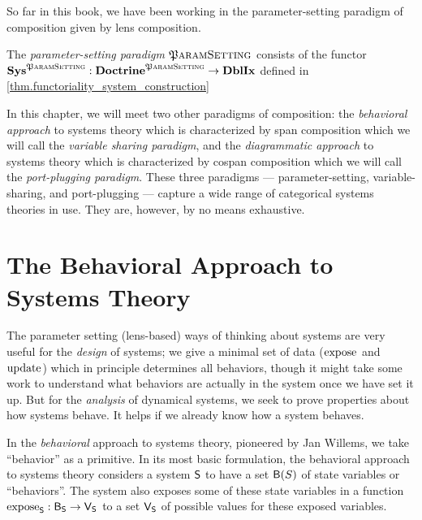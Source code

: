 \documentclass[DynamicalBook]{subfiles}
\begin{document}
So far in this book, we have been working in the parameter-setting paradigm of composition given by lens composition.
\begin{definition}
The \emph{parameter-setting paradigm} $\mathfrak{P}\textsc{aramSetting}$ consists of the functor $\textbf{Sys}^{{\mathfrak{P}\textsc{aramSetting}}} : \textbf{Doctrine}^{\mathfrak{P}\textsc{aramSetting}} \to \textbf{DblIx}$ defined in \cref{thm.functoriality_system_construction}
  \end{definition}

  In this chapter, we will meet two other paradigms of composition: the \emph{behavioral approach} to systems theory which is characterized by span composition which we will call the \emph{variable sharing paradigm}, and the \emph{diagrammatic approach} to systems theory which is characterized by cospan composition which we will call the \emph{port-plugging paradigm}. These three paradigms --- parameter-setting, variable-sharing, and port-plugging --- capture a wide range of categorical systems theories in use. They are, however, by no means exhaustive.





\section{The Behavioral Approach to Systems Theory}\label{sec:behavioral.approach}

The parameter setting (lens-based) ways of thinking about systems are very useful for the \emph{design} of systems; we give
a minimal set of data ($\mathrm{expose}_{\mathsf{}}$ and $\mathrm{update}_{\mathsf{}}$) which in principle determines all behaviors, though it
might take some work to understand what behaviors are actually in the system
once we have set it up. But for the \emph{analysis} of dynamical systems, we
seek to prove properties about how systems behave. It helps if we
already know how a system behaves.

In the \emph{behavioral} approach to systems theory, pioneered by Jan Willems,
we take ``behavior'' as a primitive. In its most basic formulation, the behavioral
approach to systems theory considers a system $\mathsf{S}$ to have a set
$\mathsf{B}(S)$ of state variables or ``behaviors''. The system also exposes some of these
state variables in a function $\mathrm{expose}_{\mathsf{S}} : \mathsf{B}_{\mathsf{S}} \to \mathsf{V}_{\mathsf{S}}$
to a set
$\mathsf{V}_{\mathsf{S}}$ of possible values for these exposed variables.
\end{document}

